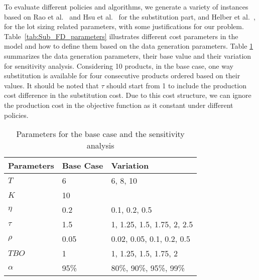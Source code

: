 \documentclass[11pt]{article}
\newcommand{\Ti}{T}
\newcommand{\Ka}{K}
\begin{document}
To evaluate different policies and algorithms, we generate a variety of instances based on Rao et al.~\cite{rao2004multi} and Hsu et al.~\cite{hsu2005dynamic} for the substitution part, and Helber et al.~\cite{helber2013dynamic}, for the lot sizing related parameters, with some justifications for our problem. Table~\ref{tab:Sub_FD_parameters} illustrates different cost parameters in the model and how to define them based on the data generation parameters.
Table \ref{tab:BaseSensitivity} summarizes the data generation parameters, their base value and their variation for sensitivity analysis. Considering 10 products, in the base case, one way substitution is available for four consecutive products ordered based on their values. It should be noted that $\tau$ should start from 1 to include the production cost difference in the substitution cost. Due to this cost structure, we can ignore the production cost in the objective function as it constant under different policies.




\begin{table}[H]
\centering
\caption{ Parameters for the base case and the sensitivity analysis} \label{tab:BaseSensitivity}
\begin{tabular}{lll}
\toprule
{ Parameters} & Base Case & Variation \\ \midrule
$\Ti$   & 6 & 6, 8, 10 \\ 
$\Ka$   & 10 & \\ 
$\eta$  &   0.2 & 0.1, 0.2, 0.5   \\ 
$\tau$  &   1.5 & 1, 1.25, 1.5, 1.75, 2, 2.5   \\ 
$\rho $  &   0.05 & 0.02, 0.05, 0.1, 0.2, 0.5   \\ 
$ TBO $  &   1 & 1, 1.25, 1.5, 1.75, 2   \\ 
$ \alpha $  &95\% & 80\%, 90\%, 95\%, 99\%  \\ 
\bottomrule 
\end{tabular}
\end{table}
\end{document}
